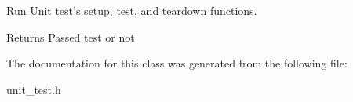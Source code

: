 Run Unit test's setup, test, and teardown functions. 

\begin{DoxyReturn}{Returns}
Passed test or not 
\end{DoxyReturn}


The documentation for this class was generated from the following file\+:\begin{DoxyCompactItemize}
\item 
unit\+\_\+test.\+h\end{DoxyCompactItemize}
